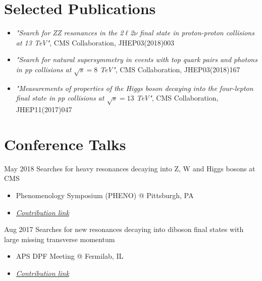 \documentclass[10pt]{article} %
\begin{document}
\section{Selected Publications}
\begin{itemize}
\item \textit{"Search for ZZ resonances in the 2$\ell$2$\nu$ final state in proton-proton collisions at 13 TeV"}, CMS Collaboration, JHEP03(2018)003

\item \textit{"Search for natural supersymmetry in events with top quark pairs and photons in pp collisions at $\sqrt{s}=8$ TeV"}, CMS Collaboration, JHEP03(2018)167

\item \textit{"Measurements of properties of the Higgs boson decaying into the four-lepton final state in pp collisions at $\sqrt{s}=13$ TeV"}, CMS Collaboration, JHEP11(2017)047 \\
\end{itemize}

\section{Conference Talks}
\job
{May 2018}{}
{Searches for heavy resonances decaying into Z, W and Higgs bosons at CMS}
{\begin{itemize}
\item Phenomenology Symposium (PHENO) @ Pittsburgh, PA
\item \href{https://indico.cern.ch/event/699148/contributions/2986197/}{\textit{Contribution link}}
\end{itemize}
}
\job
{Aug 2017}{}
{Searches for new resonances decaying into diboson final states with large missing transverse momentum}
{\begin{itemize}
\item APS DPF Meeting @ Fermilab, IL
\item \href{https://indico.fnal.gov/event/11999/session/10/contribution/56}{\textit{Contribution link}}
\end{itemize}
}
\end{document}
